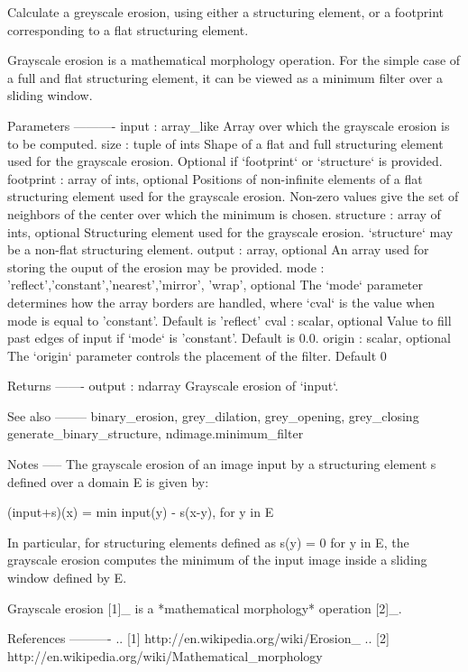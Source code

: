 \begin{DoxyVerb}Calculate a greyscale erosion, using either a structuring element,
or a footprint corresponding to a flat structuring element.

Grayscale erosion is a mathematical morphology operation. For the
simple case of a full and flat structuring element, it can be viewed
as a minimum filter over a sliding window.

Parameters
----------
input : array_like
    Array over which the grayscale erosion is to be computed.
size : tuple of ints
    Shape of a flat and full structuring element used for the grayscale
    erosion. Optional if `footprint` or `structure` is provided.
footprint : array of ints, optional
    Positions of non-infinite elements of a flat structuring element
    used for the grayscale erosion. Non-zero values give the set of
    neighbors of the center over which the minimum is chosen.
structure : array of ints, optional
    Structuring element used for the grayscale erosion. `structure`
    may be a non-flat structuring element.
output : array, optional
    An array used for storing the ouput of the erosion may be provided.
mode : {'reflect','constant','nearest','mirror', 'wrap'}, optional
    The `mode` parameter determines how the array borders are
    handled, where `cval` is the value when mode is equal to
    'constant'. Default is 'reflect'
cval : scalar, optional
    Value to fill past edges of input if `mode` is 'constant'. Default
    is 0.0.
origin : scalar, optional
    The `origin` parameter controls the placement of the filter.
    Default 0

Returns
-------
output : ndarray
    Grayscale erosion of `input`.

See also
--------
binary_erosion, grey_dilation, grey_opening, grey_closing
generate_binary_structure, ndimage.minimum_filter

Notes
-----
The grayscale erosion of an image input by a structuring element s defined
over a domain E is given by:

(input+s)(x) = min {input(y) - s(x-y), for y in E}

In particular, for structuring elements defined as
s(y) = 0 for y in E, the grayscale erosion computes the minimum of the
input image inside a sliding window defined by E.

Grayscale erosion [1]_ is a *mathematical morphology* operation [2]_.

References
----------
.. [1] http://en.wikipedia.org/wiki/Erosion_%
.. [2] http://en.wikipedia.org/wiki/Mathematical_morphology


\end{DoxyVerb}
